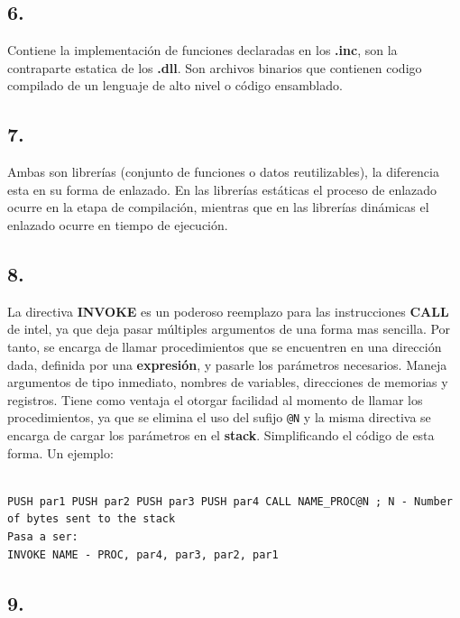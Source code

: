 \subsection*{6.}

Contiene la implementación de funciones declaradas en los \textbf{.inc}, son
la contraparte estatica de los \textbf{.dll}. Son archivos binarios que
contienen codigo compilado de un lenguaje de alto nivel o código ensamblado.

\subsection*{7.}

Ambas son librerías (conjunto de funciones o datos reutilizables), la diferencia
esta en su forma de enlazado. En las librerías estáticas el proceso de enlazado
ocurre en la etapa de compilación, mientras que en las librerías dinámicas
el enlazado ocurre en tiempo de ejecución.

\subsection*{8.}

La directiva \textbf{INVOKE} es un poderoso reemplazo para las instrucciones
\textbf{CALL} de intel, ya que deja pasar múltiples argumentos de una forma mas
sencilla. Por tanto, se encarga de llamar procedimientos que se encuentren en
una dirección dada, definida por una \textbf{expresión}, y pasarle los
parámetros necesarios.  Maneja argumentos de tipo inmediato, nombres de
variables, direcciones de memorias y registros.  Tiene como ventaja el otorgar
facilidad al momento de llamar los procedimientos, ya que se elimina el uso del
sufijo \verb|@N| y la misma directiva se encarga de cargar los parámetros en el
\textbf{stack}. Simplificando el código de esta forma. Un ejemplo:

\begin{BVerbatim}

PUSH par1 PUSH par2 PUSH par3 PUSH par4 CALL NAME_PROC@N ; N - Number of bytes sent to the stack
Pasa a ser:
INVOKE NAME - PROC, par4, par3, par2, par1

\end{BVerbatim}



\subsection*{9.}

